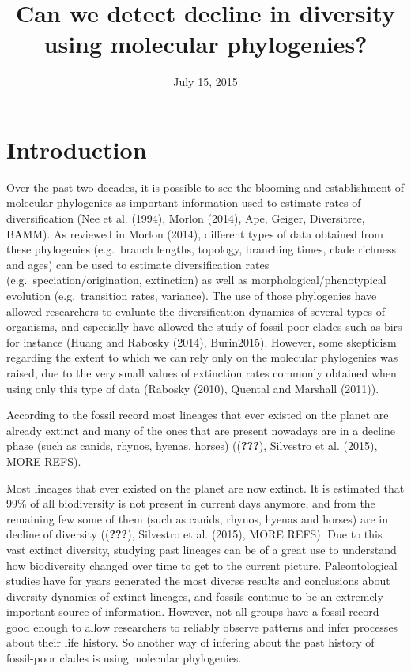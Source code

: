 \documentclass[11pt,]{article}
\title{Can we detect decline in diversity using molecular phylogenies?}
\author{}
\date{July 15, 2015}
\begin{document}
\maketitle

\section{Introduction}\label{introduction}

Over the past two decades, it is possible to see the blooming and
establishment of molecular phylogenies as important information used to
estimate rates of diversification (Nee et al. (1994), Morlon (2014),
Ape, Geiger, Diversitree, BAMM). As reviewed in Morlon (2014), different
types of data obtained from these phylogenies (e.g.~branch lengths,
topology, branching times, clade richness and ages) can be used to
estimate diversification rates (e.g.~speciation/origination, extinction)
as well as morphological/phenotypical evolution (e.g.~transition rates,
variance). The use of those phylogenies have allowed researchers to
evaluate the diversification dynamics of several types of organisms, and
especially have allowed the study of fossil-poor clades such as birs for
instance (Huang and Rabosky (2014), Burin2015). However, some skepticism
regarding the extent to which we can rely only on the molecular
phylogenies was raised, due to the very small values of extinction rates
commonly obtained when using only this type of data (Rabosky (2010),
Quental and Marshall (2011)).

According to the fossil record most lineages that ever existed on the
planet are already extinct and many of the ones that are present
nowadays are in a decline phase (such as canids, rhynos, hyenas, horses)
(({\textbf{???}}), Silvestro et al. (2015), MORE REFS).

Most lineages that ever existed on the planet are now extinct. It is
estimated that 99\% of all biodiversity is not present in current days
anymore, and from the remaining few some of them (such as canids,
rhynos, hyenas and horses) are in decline of diversity
(({\textbf{???}}), Silvestro et al. (2015), MORE REFS). Due to this vast
extinct diversity, studying past lineages can be of a great use to
understand how biodiversity changed over time to get to the current
picture. Paleontological studies have for years generated the most
diverse results and conclusions about diversity dynamics of extinct
lineages, and fossils continue to be an extremely important source of
information. However, not all groups have a fossil record good enough to
allow researchers to reliably observe patterns and infer processes about
their life history. So another way of infering about the past history of
fossil-poor clades is using molecular phylogenies.
\end{document}
